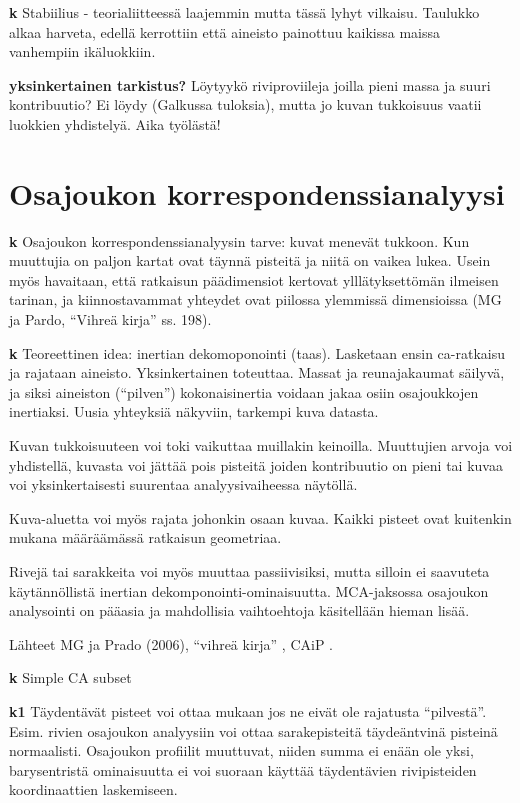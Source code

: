 \documentclass[
  finnish,
]{book}
\begin{document}
\textbf{k} Stabiilius - teorialiitteessä laajemmin mutta tässä lyhyt vilkaisu.
Taulukko alkaa harveta, edellä kerrottiin että aineisto painottuu kaikissa maissa
vanhempiin ikäluokkiin.

\textbf{yksinkertainen tarkistus?} Löytyykö riviproviileja joilla pieni massa ja suuri
kontribuutio? Ei löydy (Galkussa tuloksia), mutta jo kuvan tukkoisuus vaatii luokkien yhdistelyä. Aika työlästä!

\hypertarget{osajoukon-korrespondenssianalyysi}{%
\chapter{Osajoukon korrespondenssianalyysi}\label{osajoukon-korrespondenssianalyysi}}

\textbf{k} Osajoukon korrespondenssianalyysin tarve: kuvat menevät tukkoon. Kun muuttujia
on paljon kartat ovat täynnä pisteitä ja niitä on vaikea lukea. Usein myös havaitaan,
että ratkaisun päädimensiot kertovat ylllätyksettömän ilmeisen tarinan, ja
kiinnostavammat yhteydet ovat piilossa ylemmissä dimensioissa (MG ja Pardo, ``Vihreä
kirja'' ss. 198).

\textbf{k} Teoreettinen idea: inertian dekomoponointi (taas). Lasketaan ensin
ca-ratkaisu ja rajataan aineisto. Yksinkertainen toteuttaa. Massat ja reunajakaumat
säilyvä, ja siksi aineiston (``pilven'') kokonaisinertia voidaan jakaa osiin
osajoukkojen inertiaksi. Uusia yhteyksiä näkyviin, tarkempi kuva datasta.

Kuvan tukkoisuuteen voi toki vaikuttaa muillakin keinoilla. Muuttujien arvoja voi
yhdistellä, kuvasta voi jättää pois pisteitä joiden kontribuutio on pieni tai kuvaa
voi yksinkertaisesti suurentaa analyysivaiheessa näytöllä.

Kuva-aluetta voi myös rajata johonkin osaan kuvaa. Kaikki pisteet ovat kuitenkin
mukana määräämässä ratkaisun geometriaa.

Rivejä tai sarakkeita voi myös muuttaa passiivisiksi, mutta silloin ei saavuteta
käytännöllistä inertian dekomponointi-ominaisuutta. MCA-jaksossa osajoukon
analysointi on pääasia ja mahdollisia vaihtoehtoja käsitellään hieman lisää.

Lähteet MG ja Prado (2006)\citep{RefWorks:doc:5a857a44e4b0ed2d44664d87},
``vihreä kirja'' \citep{RefWorks:doc:5ab76b43e4b003f4468d1f07},
CAiP \citep{RefWorks:doc:5a857a43e4b0ed2d44664d78}.

\textbf{k} Simple CA subset

\textbf{k1} Täydentävät pisteet voi ottaa mukaan jos ne eivät ole rajatusta ``pilvestä''.
Esim. rivien osajoukon analyysiin voi ottaa sarakepisteitä täydeäntvinä pisteinä
normaalisti. Osajoukon profiilit muuttuvat, niiden summa ei enään ole yksi,
barysentristä ominaisuutta ei voi suoraan käyttää täydentävien rivipisteiden
koordinaattien laskemiseen.
\end{document}
